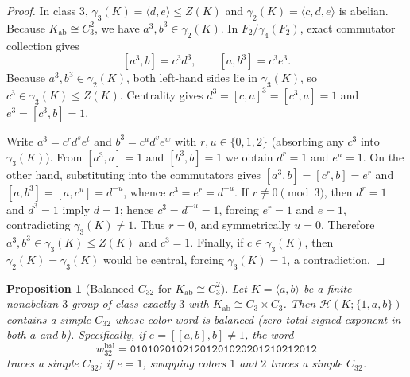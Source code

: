 \documentclass[11pt]{amsart}
\newtheorem{proposition}[theorem]{Proposition}
\theoremstyle{definition}
\theoremstyle{remark}
\newcommand{\Haar}{\mathcal{H}}
\begin{document}
\begin{proof}
In class $3$, $\gamma_3(K) = \langle d, e \rangle \le Z(K)$ and $\gamma_2(K) = \langle c, d, e \rangle$ is abelian. Because $K_{\mathrm{ab}} \cong C_3^2$, we have $a^3, b^3 \in \gamma_2(K)$. In $F_2/\gamma_4(F_2)$, exact commutator collection gives
\[
[a^3, b] = c^3 d^3, \qquad [a, b^3] = c^3 e^3.
\]
Because $a^3, b^3 \in \gamma_2(K)$, both left-hand sides lie in $\gamma_3(K)$, so $c^3 \in \gamma_3(K) \le Z(K)$. Centrality gives $d^3 = [c,a]^3 = [c^3, a] = 1$ and $e^3 = [c^3, b] = 1$.

Write $a^3 = c^r d^s e^t$ and $b^3 = c^u d^v e^w$ with $r, u \in \{0,1,2\}$ (absorbing any $c^3$ into $\gamma_3(K)$). From $[a^3, a] = 1$ and $[b^3, b] = 1$ we obtain $d^r = 1$ and $e^u = 1$. On the other hand, substituting into the commutators gives $[a^3, b] = [c^r, b] = e^r$ and $[a, b^3] = [a, c^u] = d^{-u}$, whence $c^3 = e^r = d^{-u}$. If $r \not\equiv 0 \pmod 3$, then $d^r = 1$ and $d^3 = 1$ imply $d = 1$; hence $c^3 = d^{-u} = 1$, forcing $e^r = 1$ and $e = 1$, contradicting $\gamma_3(K) \ne 1$. Thus $r = 0$, and symmetrically $u = 0$. Therefore $a^3, b^3 \in \gamma_3(K) \le Z(K)$ and $c^3 = 1$. Finally, if $c \in \gamma_3(K)$, then $\gamma_2(K) = \gamma_3(K)$ would be central, forcing $\gamma_3(K) = 1$, a contradiction.
\end{proof}

\begin{proposition}[Balanced $C_{32}$ for $K_{\mathrm{ab}} \cong C_3^2$]\label{prop:class3_p3_c3xc3}
Let $K = \langle a, b \rangle$ be a finite nonabelian $3$-group of class exactly $3$ with $K_{\mathrm{ab}} \cong C_3 \times C_3$. Then $\Haar(K; \{1,a,b\})$ contains a simple $C_{32}$ whose color word is balanced (zero total signed exponent in both $a$ and $b$). Specifically, if $e = [[a,b],b] \ne 1$, the word
\[
w_{32}^{\mathrm{bal}} = \mathtt{01010201021201201020201210212012}
\]
traces a simple $C_{32}$; if $e = 1$, swapping colors $1$ and $2$ traces a simple $C_{32}$.
\end{proposition}
\end{document}
